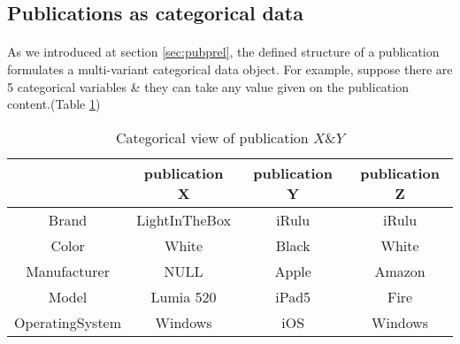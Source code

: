 \documentclass[a4paper,12pt,oneside]{book}
\theoremstyle{definition}
\theoremstyle{remark}
\begin{document}
%
%
%

\subsection{Publications as categorical data}
\label{sec:pubcat}
\paragraph*{}
As we introduced at section \ref{sec:pubprel}, the defined structure of a publication formulates a multi-variant categorical data object. For example, suppose there are 5 categorical variables \& they can take any value given on the publication content.(Table \ref{table:catviewpub})

\begin{table}[h!]
\centering
\begin{tabular}{|c|c|c|c|}
\hline & publication X & publication Y & publication Z \\
\hline Brand & LightInTheBox & iRulu & iRulu \\
\hline Color & White & Black & White \\
\hline Manufacturer & NULL & Apple & Amazon \\
\hline Model & Lumia 520 & iPad5 & Fire \\
\hline OperatingSystem & Windows & iOS & Windows \\
\hline
\end{tabular}
\caption{Categorical view of publication $X \& Y$}
\label{table:catviewpub}
\end{table}
\end{document}
